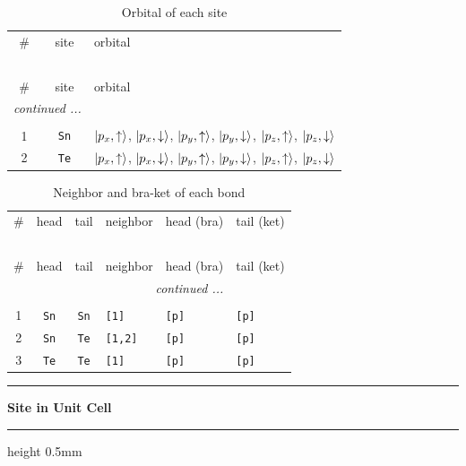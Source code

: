 \documentclass[fleqn,10pt,landscape]{jsarticle}
\begin{document}
\renewcommand{\arraystretch}{1.6}
\begin{longtable}[l]{ccl}
\captionsetup{justification=raggedright, singlelinecheck=off}
\caption{Orbital of each site}
 \\
 \hline \hline
\# & site & orbital \\ \hline \endfirsthead

\multicolumn{2}{l}{\tablename\ \thetable{}} \\
 \hline \hline
\# & site & orbital \\ \hline \endhead

 \hline \hline
\multicolumn{2}{r}{\footnotesize\it continued ...} \\ \endfoot

 \hline \hline
\multicolumn{2}{r}{} \\ \endlastfoot

1 & \texttt{Sn} & $\ket{p_{x},\uparrow}$, $\ket{p_{x},\downarrow}$, $\ket{p_{y},\uparrow}$, $\ket{p_{y},\downarrow}$, $\ket{p_{z},\uparrow}$, $\ket{p_{z},\downarrow}$ \\ \hline
2 & \texttt{Te} & $\ket{p_{x},\uparrow}$, $\ket{p_{x},\downarrow}$, $\ket{p_{y},\uparrow}$, $\ket{p_{y},\downarrow}$, $\ket{p_{z},\uparrow}$, $\ket{p_{z},\downarrow}$ \\
\end{longtable}
\renewcommand{\arraystretch}{1.6}
\begin{longtable}[l]{ccclll}
\captionsetup{justification=raggedright, singlelinecheck=off}
\caption{Neighbor and bra-ket of each bond}
 \\
 \hline \hline
\# & head & tail & neighbor & head (bra) & tail (ket) \\ \hline \endfirsthead

\multicolumn{5}{l}{\tablename\ \thetable{}} \\
 \hline \hline
\# & head & tail & neighbor & head (bra) & tail (ket) \\ \hline \endhead

 \hline \hline
\multicolumn{5}{r}{\footnotesize\it continued ...} \\ \endfoot

 \hline \hline
\multicolumn{5}{r}{} \\ \endlastfoot

1 & \texttt{Sn} & \texttt{Sn} & \texttt{[1]} & \texttt{[p]} & \texttt{[p]} \\ \hline
2 & \texttt{Sn} & \texttt{Te} & \texttt{[1,2]} & \texttt{[p]} & \texttt{[p]} \\ \hline
3 & \texttt{Te} & \texttt{Te} & \texttt{[1]} & \texttt{[p]} & \texttt{[p]} \\
\end{longtable}
\vspace{5mm}
\noindent \rule[0.5mm]{5mm}{0.5mm}\hspace{3mm}\textbf{Site in Unit Cell}\hspace{3mm}\leaders\hrule height 0.5mm\hfill\kern0pt
\vspace{3mm}
\end{document}
